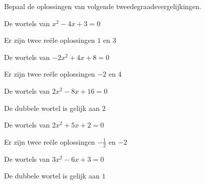 \documentclass{ximera}
\begin{document}
\begin{exercise} Bepaal de oplossingen van volgende tweedegraadsvergelijkingen. 
  
    \begin{question} De wortels van \( x^2 - 4x + 3    = 0 \) \begin{uitkomst} Er zijn twee reële oplossingen \( 1 \) en  \( 3 \)          \end{uitkomst}\end{question}
    \begin{question} De wortels van \( -2x^2 + 4x + 8  = 0 \) \begin{uitkomst} Er zijn twee reële oplossingen \( -2 \) en  \(4 \)          \end{uitkomst}\end{question}
    \begin{question} De wortels van \( 2x^2 - 8x + 16  = 0 \) \begin{uitkomst} De dubbele wortel is gelijk aan \( 2 \)                     \end{uitkomst}\end{question}
    \begin{question} De wortels van \( 2x^2 + 5x + 2   = 0 \) \begin{uitkomst} Er zijn twee reële oplossingen \( -\frac{1}{2}\) en \(-2 \) \end{uitkomst}\end{question}
    \begin{question} De wortels van \( 3x^2 - 6x + 3   = 0 \) \begin{uitkomst} De dubbele wortel is gelijk aan \( 1   \)                   \end{uitkomst}\end{question}

\end{exercise}
\end{document}

